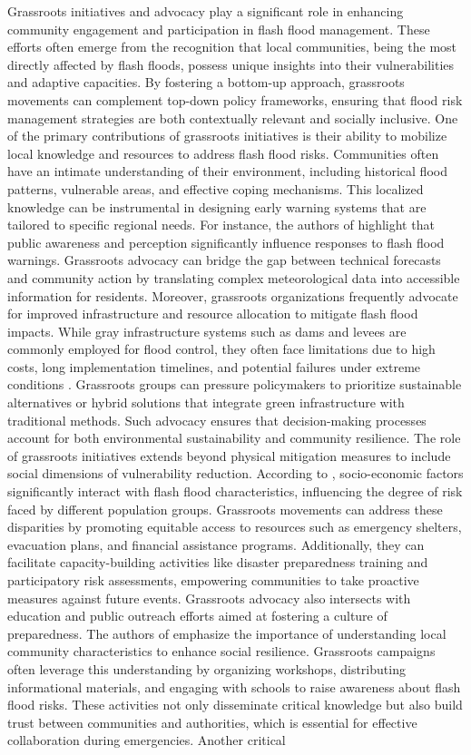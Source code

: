 Grassroots initiatives and advocacy play a significant role in enhancing community engagement and participation in flash flood management. These efforts often emerge from the recognition that local communities, being the most directly affected by flash floods, possess unique insights into their vulnerabilities and adaptive capacities. By fostering a bottom-up approach, grassroots movements can complement top-down policy frameworks, ensuring that flood risk management strategies are both contextually relevant and socially inclusive. One of the primary contributions of grassroots initiatives is their ability to mobilize local knowledge and resources to address flash flood risks. Communities often have an intimate understanding of their environment, including historical flood patterns, vulnerable areas, and effective coping mechanisms. This localized knowledge can be instrumental in designing early warning systems that are tailored to specific regional needs. For instance, the authors of \citep{Henderson2020} highlight that public awareness and perception significantly influence responses to flash flood warnings. Grassroots advocacy can bridge the gap between technical forecasts and community action by translating complex meteorological data into accessible information for residents. Moreover, grassroots organizations frequently advocate for improved infrastructure and resource allocation to mitigate flash flood impacts. While gray infrastructure systems such as dams and levees are commonly employed for flood control, they often face limitations due to high costs, long implementation timelines, and potential failures under extreme conditions \citep{Abegaz2024}. Grassroots groups can pressure policymakers to prioritize sustainable alternatives or hybrid solutions that integrate green infrastructure with traditional methods. Such advocacy ensures that decision-making processes account for both environmental sustainability and community resilience. The role of grassroots initiatives extends beyond physical mitigation measures to include social dimensions of vulnerability reduction. According to \citep{Khajehei2020}, socio-economic factors significantly interact with flash flood characteristics, influencing the degree of risk faced by different population groups. Grassroots movements can address these disparities by promoting equitable access to resources such as emergency shelters, evacuation plans, and financial assistance programs. Additionally, they can facilitate capacity-building activities like disaster preparedness training and participatory risk assessments, empowering communities to take proactive measures against future events. Grassroots advocacy also intersects with education and public outreach efforts aimed at fostering a culture of preparedness. The authors of \citep{Bodoque2019} emphasize the importance of understanding local community characteristics to enhance social resilience. Grassroots campaigns often leverage this understanding by organizing workshops, distributing informational materials, and engaging with schools to raise awareness about flash flood risks. These activities not only disseminate critical knowledge but also build trust between communities and authorities, which is essential for effective collaboration during emergencies. Another critical 